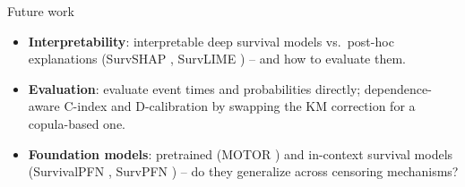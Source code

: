 \begin{frame}{Future work}
\begin{itemize}
  \item \textbf{Interpretability}: interpretable deep survival models vs.\ post-hoc explanations (SurvSHAP \cite{Krzyzinski2023SurvSHAPt}, SurvLIME \cite{Kovalev2020SurvLIME}) -- and how to evaluate them.
  \vspace{0.6em}
  \item \textbf{Evaluation}: evaluate event times and probabilities directly; dependence-aware C-index and D-calibration by swapping the KM correction for a copula-based one.
  \vspace{0.6em}
  \item \textbf{Foundation models}: pretrained (MOTOR \cite{steinberg2024motor}) and in-context survival models (SurvivalPFN \cite{qi2026survivalpfn}, SurvPFN \cite{bohm2026survpfn}) -- do they generalize across censoring mechanisms?
\end{itemize}
\end{frame}


